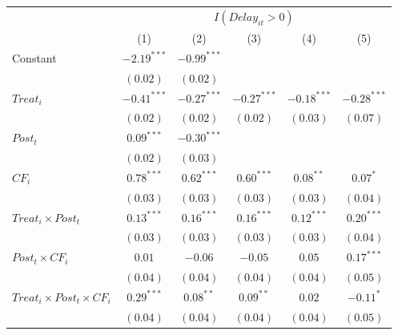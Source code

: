 \documentclass[
]{article}
\begin{document}
\begin{table}
\begin{center}
\begin{tabular}{l c c c c c}
\hline
 & \multicolumn{5}{c}{$I(Delay_{it}>0)$} \\
\cline{2-6}
 & (1) & (2) & (3) & (4) & (5) \\
\hline
Constant                                   & $-2.19^{***}$ & $-0.99^{***}$ &               &               &               \\
                                           & $(0.02)$      & $(0.02)$      &               &               &               \\
$Treat_i$                                  & $-0.41^{***}$ & $-0.27^{***}$ & $-0.27^{***}$ & $-0.18^{***}$ & $-0.28^{***}$ \\
                                           & $(0.02)$      & $(0.02)$      & $(0.02)$      & $(0.03)$      & $(0.07)$      \\
$Post_t$                                   & $0.09^{***}$  & $-0.30^{***}$ &               &               &               \\
                                           & $(0.02)$      & $(0.03)$      &               &               &               \\
$CF_i$                                     & $0.78^{***}$  & $0.62^{***}$  & $0.60^{***}$  & $0.08^{**}$   & $0.07^{*}$    \\
                                           & $(0.03)$      & $(0.03)$      & $(0.03)$      & $(0.03)$      & $(0.04)$      \\
$Treat_i \times Post_t$                    & $0.13^{***}$  & $0.16^{***}$  & $0.16^{***}$  & $0.12^{***}$  & $0.20^{***}$  \\
                                           & $(0.03)$      & $(0.03)$      & $(0.03)$      & $(0.03)$      & $(0.04)$      \\
$Post_t \times CF_i$                       & $0.01$        & $-0.06$       & $-0.05$       & $0.05$        & $0.17^{***}$  \\
                                           & $(0.04)$      & $(0.04)$      & $(0.04)$      & $(0.04)$      & $(0.05)$      \\
$Treat_i \times Post_t \times CF_i$        & $0.29^{***}$  & $0.08^{**}$   & $0.09^{**}$   & $0.02$        & $-0.11^{*}$   \\
                                           & $(0.04)$      & $(0.04)$      & $(0.04)$      & $(0.04)$      & $(0.05)$      \\

\end{tabular}
\end{center}
\end{table}
\end{document}
